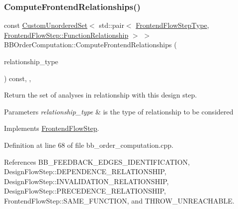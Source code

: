 \subsubsection{\texorpdfstring{Compute\+Frontend\+Relationships()}{ComputeFrontendRelationships()}}
{\footnotesize\ttfamily const \hyperlink{classCustomUnorderedSet}{Custom\+Unordered\+Set}$<$ std\+::pair$<$ \hyperlink{frontend__flow__step_8hpp_afeb3716c693d2b2e4ed3e6d04c3b63bb}{Frontend\+Flow\+Step\+Type}, \hyperlink{classFrontendFlowStep_af7cf30f2023e5b99e637dc2058289ab0}{Frontend\+Flow\+Step\+::\+Function\+Relationship} $>$ $>$ B\+B\+Order\+Computation\+::\+Compute\+Frontend\+Relationships (\begin{DoxyParamCaption}\item[{const \hyperlink{classDesignFlowStep_a723a3baf19ff2ceb77bc13e099d0b1b7}{Design\+Flow\+Step\+::\+Relationship\+Type}}]{relationship\+\_\+type }\end{DoxyParamCaption}) const\hspace{0.3cm}{\ttfamily [override]}, {\ttfamily [private]}, {\ttfamily [virtual]}}



Return the set of analyses in relationship with this design step. 


\begin{DoxyParams}{Parameters}
{\em relationship\+\_\+type} & is the type of relationship to be considered \\
\hline
\end{DoxyParams}


Implements \hyperlink{classFrontendFlowStep_abeaff70b59734e462d347ed343dd700d}{Frontend\+Flow\+Step}.



Definition at line 68 of file bb\+\_\+order\+\_\+computation.\+cpp.



References B\+B\+\_\+\+F\+E\+E\+D\+B\+A\+C\+K\+\_\+\+E\+D\+G\+E\+S\+\_\+\+I\+D\+E\+N\+T\+I\+F\+I\+C\+A\+T\+I\+ON, Design\+Flow\+Step\+::\+D\+E\+P\+E\+N\+D\+E\+N\+C\+E\+\_\+\+R\+E\+L\+A\+T\+I\+O\+N\+S\+H\+IP, Design\+Flow\+Step\+::\+I\+N\+V\+A\+L\+I\+D\+A\+T\+I\+O\+N\+\_\+\+R\+E\+L\+A\+T\+I\+O\+N\+S\+H\+IP, Design\+Flow\+Step\+::\+P\+R\+E\+C\+E\+D\+E\+N\+C\+E\+\_\+\+R\+E\+L\+A\+T\+I\+O\+N\+S\+H\+IP, Frontend\+Flow\+Step\+::\+S\+A\+M\+E\+\_\+\+F\+U\+N\+C\+T\+I\+ON, and T\+H\+R\+O\+W\+\_\+\+U\+N\+R\+E\+A\+C\+H\+A\+B\+LE.

\mbox{\label{classBBOrderComputation_a3f9b91887a6fac728cdda5a5cbf92877}} 
